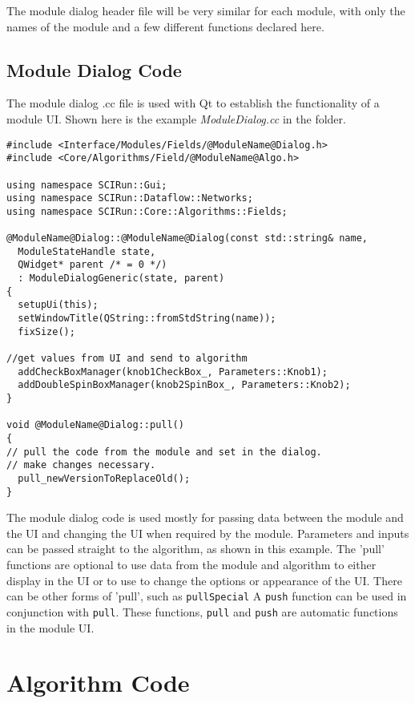 \documentclass[fleqn,11pt,openany]{book}
\begin{document}
The module dialog header file will be very similar for each module, with only the names of the module and a few different functions declared here.  


\subsection{Module Dialog Code}

The module dialog .cc file is used with Qt to establish the functionality of a module UI.  
Shown here is the example \emph{ModuleDialog.cc} in the \emph{} folder.
\begin{verbatim}
#include <Interface/Modules/Fields/@ModuleName@Dialog.h>
#include <Core/Algorithms/Field/@ModuleName@Algo.h>

using namespace SCIRun::Gui;
using namespace SCIRun::Dataflow::Networks;
using namespace SCIRun::Core::Algorithms::Fields;

@ModuleName@Dialog::@ModuleName@Dialog(const std::string& name, 
  ModuleStateHandle state,
  QWidget* parent /* = 0 */)
  : ModuleDialogGeneric(state, parent)
{
  setupUi(this);
  setWindowTitle(QString::fromStdString(name));
  fixSize();

//get values from UI and send to algorithm 
  addCheckBoxManager(knob1CheckBox_, Parameters::Knob1);
  addDoubleSpinBoxManager(knob2SpinBox_, Parameters::Knob2);
}

void @ModuleName@Dialog::pull()
{
// pull the code from the module and set in the dialog. 
// make changes necessary.
  pull_newVersionToReplaceOld();
}
\end{verbatim}

The module dialog code is used mostly for passing data between the module and the UI and changing the UI when required by the module.  
Parameters and inputs can be passed straight to the algorithm, as shown in this example.  
The 'pull' functions are optional to use data from the module and algorithm to either display in the UI or to use to change the options or appearance of the UI.  
There can be other forms of 'pull', such as \verb|pullSpecial|
A \verb|push| function can be used in conjunction with \verb|pull|.
These functions, \verb|pull| and \verb|push| are automatic functions in the module UI.

\section{Algorithm Code}
\label{sec:algo}
\end{document}
